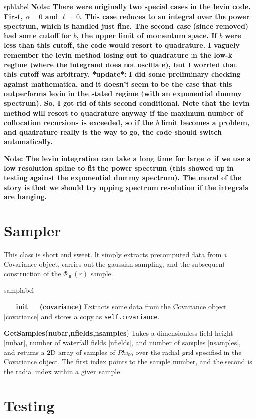 \documentclass[10pt,a4paper]{article}
\begin{document}
\begin{labeling}{sphlabel}
	\textbf{Note: There were originally two special cases in the levin code. First, $\alpha=0$ and $\ell=0$. This case reduces to an integral over the power spectrum, which is handled just fine. The second case (since removed) had some cutoff for $b$, the upper limit of momentum space. If $b$ were less than this cutoff, the code would resort to quadrature. I vaguely remember the levin method losing out to
	quadrature in the low-k regime (where the integrand does not oscillate), but I worried that this cutoff was arbitrary. 
	*update*: I did some preliminary checking against mathematica, and it doesn't seem to be the case that this outperforms levin in the stated regime (with an exponential dummy spectrum). So, I got rid of this second conditional. Note that the levin method will resort to quadrature anyway if the maximum number of collocation recursions is exceeded, so if the $b$ limit becomes a problem, and quadrature really is the way to go, the code should switch automatically.}
	
	\textbf{Note: The levin integration can take a long time for large $\alpha$ if we use a low resolution spline to fit the power spectrum (this showed up in testing against the exponential dummy spectrum). The moral of the story is that we should try upping spectrum resolution if the integrals are hanging.}
\end{labeling}

\section{Sampler}
This class is short and sweet. It simply extracts precomputed data from a Covariance object, carries out the gaussian sampling, and the subsequent construction of the $\Phi_{00}(r)$ sample.
\begin{labeling}{samplabel}
	\item[\textbf{\_\_init\_\_(covariance)}] Extracts some data from the
	Covariance object [covariance] and stores a copy as \verb|self.covariance|.
	
	\item[\textbf{GetSamples(nubar,nfields,nsamples)}] Takes a dimensionless field height [nubar], number of waterfall fields [nfields], and number of samples [nsamples], and returns a 2D array of samples of $Phi_{00}$ over the radial grid specified in the Covariance object. The first index points to the sample number, and the second is the radial index within a given sample.
\end{labeling}
\section{Testing}
\end{document}
